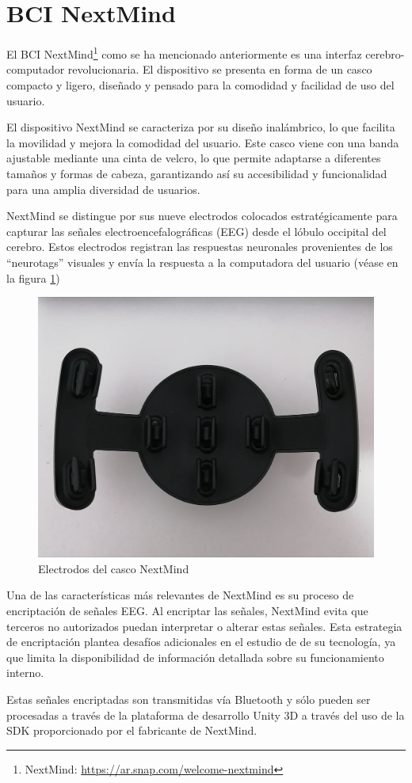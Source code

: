 \section{BCI NextMind}

El BCI NextMind\footnote{NextMind: \url{https://ar.snap.com/welcome-nextmind}} como se ha mencionado anteriormente es una interfaz cerebro-computador revolucionaria. El dispositivo se presenta en forma de un casco compacto y ligero, diseñado y pensado para la comodidad y facilidad de uso del usuario.



El dispositivo NextMind se caracteriza por su diseño inalámbrico, lo que facilita la movilidad y mejora la comodidad del usuario. Este casco viene con una banda ajustable mediante una cinta de velcro, lo que permite adaptarse a diferentes tamaños y formas de cabeza, garantizando así su accesibilidad y funcionalidad para una amplia diversidad de usuarios.



NextMind se distingue por sus nueve electrodos colocados estratégicamente para capturar las señales electroencefalográficas (EEG) desde el lóbulo occipital del cerebro. Estos electrodos registran las respuestas neuronales provenientes de los ``neurotags'' visuales y envía la respuesta a la computadora del usuario (véase en la figura \ref{figure:nextmind-electrodes})

\begin{figure}[!htb]
   \centering
    \includegraphics[width=0.5\linewidth]{figures/NextMind electrodes.jpg}
   \caption{Electrodos del casco NextMind}
   \label{figure:nextmind-electrodes}
\end{figure}



Una de las características más relevantes de NextMind es su proceso de encriptación de señales EEG. Al encriptar las señales, NextMind evita que terceros no autorizados puedan interpretar o alterar estas señales. Esta estrategia de encriptación plantea desafíos adicionales en el estudio de de su tecnología, ya que limita la disponibilidad de información detallada sobre su funcionamiento interno.



Estas señales encriptadas son transmitidas vía Bluetooth y sólo pueden ser procesadas a través de la plataforma de desarrollo Unity 3D a través del uso de la SDK proporcionado por el fabricante de NextMind.
